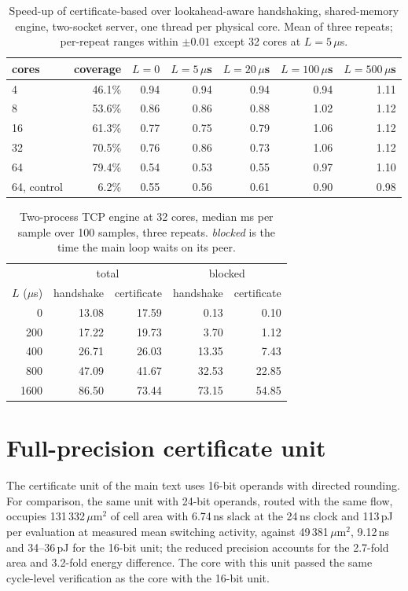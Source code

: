 \documentclass{iopjournal}
\begin{document}
\begin{table}
\caption{\label{s_tab:speed}Speed-up of certificate-based over lookahead-aware handshaking, shared-memory engine, two-socket server, one thread per physical core. Mean of three repeats; per-repeat ranges within $\pm0.01$ except 32 cores at $L=5\,\mu$s.}
\centering
\begin{tabular}{lrrrrrr}
\hline
cores & coverage & $L=0$ & $L=5$\,$\mu$s & $L=20$\,$\mu$s & $L=100$\,$\mu$s & $L=500$\,$\mu$s \\
\hline
4  & 46.1\% & 0.94 & 0.94 & 0.94 & 0.94 & 1.11 \\
8  & 53.6\% & 0.86 & 0.86 & 0.88 & 1.02 & 1.12 \\
16 & 61.3\% & 0.77 & 0.75 & 0.79 & 1.06 & 1.12 \\
32 & 70.5\% & 0.76 & 0.86 & 0.73 & 1.06 & 1.12 \\
64 & 79.4\% & 0.54 & 0.53 & 0.55 & 0.97 & 1.10 \\
64, control & 6.2\% & 0.55 & 0.56 & 0.61 & 0.90 & 0.98 \\
\hline
\end{tabular}
\end{table}

\begin{table}
\caption{\label{s_tab:tcp}Two-process TCP engine at 32 cores, median ms per sample over 100 samples, three repeats. \emph{blocked} is the time the main loop waits on its peer.}
\centering
\begin{tabular}{rrrrr}
\hline
 & \multicolumn{2}{c}{total} & \multicolumn{2}{c}{blocked} \\
$L$ ($\mu$s) & handshake & certificate & handshake & certificate \\
\hline
0    & 13.08 & 17.59 & 0.13 & 0.10 \\
200  & 17.22 & 19.73 & 3.70 & 1.12 \\
400  & 26.71 & 26.03 & 13.35 & 7.43 \\
800  & 47.09 & 41.67 & 32.53 & 22.85 \\
1600 & 86.50 & 73.44 & 73.15 & 54.85 \\
\hline
\end{tabular}
\end{table}

\section{Full-precision certificate unit}

The certificate unit of the main text uses 16-bit operands with directed rounding. For comparison, the same unit with 24-bit operands, routed with the same flow, occupies 131\,332\,$\mu$m$^2$ of cell area with 6.74\,ns slack at the 24\,ns clock and 113\,pJ per evaluation at measured mean switching activity, against 49\,381\,$\mu$m$^2$, 9.12\,ns and 34--36\,pJ for the 16-bit unit; the reduced precision accounts for the 2.7-fold area and 3.2-fold energy difference. The core with this unit passed the same cycle-level verification as the core with the 16-bit unit.
\end{document}
